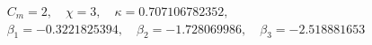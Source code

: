 $$
\begin{gathered}
C_m = 2,\quad \chi = 3,\quad \kappa = 0.707106782352,\\
\beta_1 = -0.3221825394,\quad \beta_2 = -1.728069986,\quad \beta_3 = -2.518881653
\end{gathered}
$$
